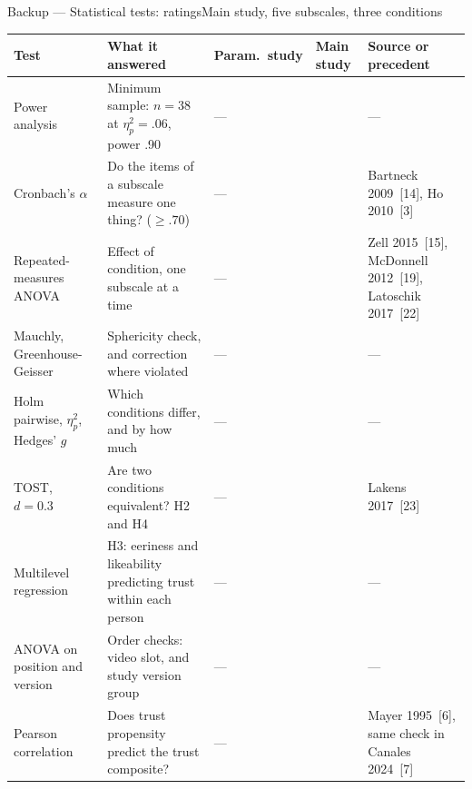 \documentclass[aspectratio=169,10pt]{beamer}
\newcommand{\good}[1]{{\color{kngreen}\textbf{#1}}}
\begin{document}
\begin{frame}{Backup — Statistical tests: ratings}{Main study, five subscales, three conditions}
  \vspace{0.1em}
  {\tiny
  \setlength{\tabcolsep}{4pt}\renewcommand{\arraystretch}{1.3}
  \begin{tabular}{@{}>{\raggedright\arraybackslash}m{}>{\raggedright\arraybackslash}m{}>{\centering\arraybackslash}m{}>{\centering\arraybackslash}m{}>{\raggedright\arraybackslash}m{}@{}}
    \toprule
    \textbf{Test} & \textbf{What it answered} & \textbf{Param.\ study} & \textbf{Main study} & \textbf{Source or precedent} \\
    \midrule
    Power analysis & Minimum sample: $n=38$ at $\eta^2_p=.06$, power .90 & --- & \good{\checkmark} & --- \\
    Cronbach's $\alpha$ & Do the items of a subscale measure one thing? ($\geq .70$) & --- & \good{\checkmark} & Bartneck 2009~[14], Ho 2010~[3] \\
    Repeated-measures ANOVA & Effect of condition, one subscale at a time & --- & \good{\checkmark} & Zell 2015~[15], McDonnell 2012~[19], Latoschik 2017~[22] \\
    Mauchly, Greenhouse-Geisser & Sphericity check, and correction where violated & --- & \good{\checkmark} & --- \\
    Holm pairwise, $\eta^2_p$, Hedges' $g$ & Which conditions differ, and by how much & --- & \good{\checkmark} & --- \\
    TOST, $d=0.3$ & Are two conditions equivalent? H2 and H4 & --- & \good{\checkmark} & Lakens 2017~[23] \\
    Multilevel regression & H3: eeriness and likeability predicting trust within each person & --- & \good{\checkmark} & --- \\
    ANOVA on position and version & Order checks: video slot, and study version group & --- & \good{\checkmark} & --- \\
    Pearson correlation & Does trust propensity predict the trust composite? & --- & \good{\checkmark} & Mayer 1995~[6], same check in Canales 2024~[7] \\
    \bottomrule
  \end{tabular}\par}
\end{frame}
\end{document}
